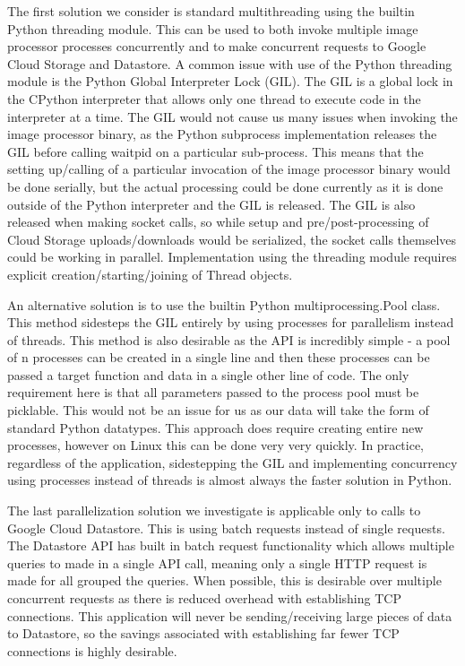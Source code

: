 \documentclass[10pt, onecolumn, draftclsnofoot, letterpaper, compsoc]{IEEEtran}
\begin{document}
The first solution we consider is standard multithreading using the builtin 
Python threading module. This can be used to both invoke multiple image 
processor processes concurrently and to make concurrent requests to Google 
Cloud Storage and Datastore. A common issue with use of the Python threading 
module is the Python Global Interpreter Lock (GIL)\cite{gilArticle}. The GIL 
is a global lock in the CPython interpreter that allows only one thread to 
execute code in the interpreter at a time\cite{gilArticle}. The GIL would 
not cause us many issues when invoking the image processor binary, as 
the Python subprocess implementation releases the GIL before calling 
waitpid on a particular sub-process. This means that the 
setting up/calling of a particular invocation of the image processor binary 
would be done serially, but the actual processing could be done currently as 
it is done outside of the Python interpreter and the GIL is released\cite{gilArticle}. 
The GIL is also released when making socket calls, so while setup and 
pre/post-processing of Cloud Storage uploads/downloads would be 
serialized, the socket calls themselves could be working in parallel\cite{gilArticle}. 
Implementation using the threading module requires explicit 
creation/starting/joining of Thread objects.

An alternative solution is to use the builtin Python multiprocessing.Pool 
class. This method sidesteps the GIL entirely by using processes for 
parallelism instead of threads\cite{multiproc}. This method is also desirable 
as the API is incredibly simple - a pool of n processes can be created in a 
single line and then these processes can be passed a target function and 
data in a single other line of code\cite{multiproc}. The only requirement 
here is that all parameters passed to the process pool must be picklable\cite{multiproc}. 
This would not be an issue for us as our data will take the form of standard 
Python datatypes. This approach does require creating entire new processes, 
however on Linux this can be done very very quickly. In practice, regardless 
of the application, sidestepping the GIL and implementing concurrency using 
processes instead of threads is almost always the faster solution in Python.

The last parallelization solution we investigate is applicable only to calls to 
Google Cloud Datastore. This is using batch requests instead of single requests. 
The Datastore API has built in batch request functionality which allows multiple 
queries to made in a single API call, meaning only a single HTTP request is made 
for all grouped the queries\cite{batches}. When possible, this is desirable over 
multiple concurrent requests as there is reduced overhead with establishing 
TCP connections. This application will never be sending/receiving large 
pieces of data to Datastore, so the savings associated with establishing 
far fewer TCP connections is highly desirable.
\end{document}
